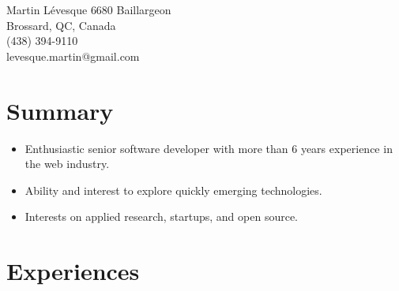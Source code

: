 \documentclass{cv}
\begin{document}
\selectfont
\entete
{Martin L\'evesque}
{6680 Baillargeon\\
Brossard, QC, Canada\\
(438) 394-9110\\
levesque.martin@gmail.com}


\section{Summary}
\begin{itemize}
\item Enthusiastic senior software developer with more than 6 years experience in the web industry.
\item Ability and interest to explore quickly emerging technologies.
\item Interests on applied research, startups, and open source.
\end{itemize}

\section{Experiences}
\end{document}
